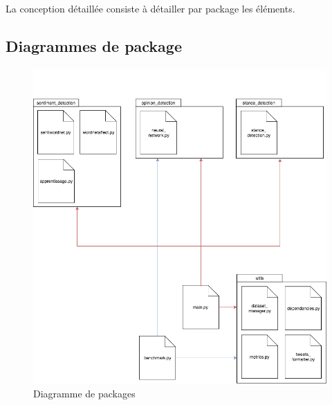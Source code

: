 \par La conception détaillée consiste à détailler par package les éléments.  \\

\subsection{Diagrammes de package}
\begin{figure}[h!]
	\centerline{\includegraphics[width=\textwidth]{img/diagramme_package.png}}
	\caption{Diagramme de packages}
\end{figure}
